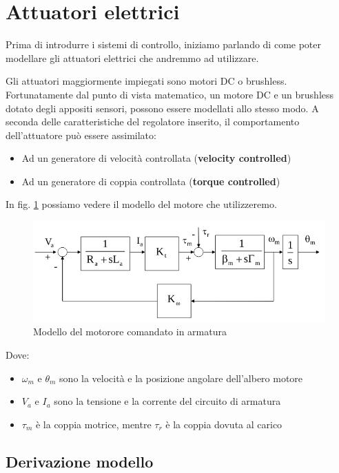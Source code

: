 \section{Attuatori elettrici}
Prima di introdurre i sistemi di controllo, iniziamo parlando di come poter modellare gli attuatori elettrici che andremmo ad utilizzare.

Gli attuatori maggiormente impiegati sono motori DC o brushless. Fortunatamente dal punto di vista matematico, un motore DC e un brushless dotato degli appositi sensori, possono essere modellati allo stesso modo.
A seconda delle caratteristiche del regolatore inserito, il comportamento dell’attuatore può essere assimilato:
\begin{itemize}
	\item Ad un generatore di velocità controllata (\textbf{velocity controlled})
	\item Ad un generatore di coppia controllata (\textbf{torque controlled})
\end{itemize}

In fig. \ref{fig:electricactuator1} possiamo vedere il modello del motore che utilizzeremo.

\begin{figure}[th!]
	\centering
	\includegraphics[width=0.7\linewidth]{images/electric_actuator_1}
	\caption{Modello del motorore comandato in armatura}
	\label{fig:electricactuator1}
\end{figure}

Dove:
\begin{itemize}
	\item $\omega_m$ e $\theta_m$ sono la velocità e la posizione angolare dell’albero
	motore
	\item $V_a$ e $I_a$ sono la tensione e la corrente del circuito di armatura
	\item $\tau_m$ è la coppia motrice, mentre $\tau_r$ è la coppia dovuta al carico
\end{itemize}


\subsection{Derivazione modello}

